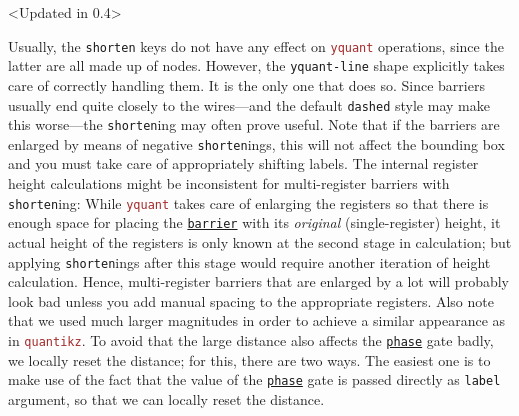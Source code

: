 \documentclass{scrartcl}
\makeatletter
\newenvironment{codeexample*}{%
   \VerbatimEnvironment%
   \let\FVB@VerbatimOut\minted@FVB@VerbatimOut
   \let\FVE@VerbatimOut\minted@FVE@VerbatimOut
   \minted@configlang{tex}%
   \minted@fvset
   \begin{VerbatimOut}[codes={\catcode`\^^I=12},firstline,lastline]{\minted@jobname.pyg}%
}{
   \end{VerbatimOut}%
   \minted@langlinenoson%
   \begin{adjustbox}{center}
       \minted@jobname.pyg %
   \end{adjustbox}\nopagebreak
   \expandafter\minted@pygmentize\expandafter{\minted@lang}%
   \minted@langlinenosoff%
   \par%
}
\def\pkg#1{\textcolor{brown}{\texttt{#1}}}
\def\gate#1{\hyperref[gate:#1]{\texttt{#1}}}
\def\Yquant{\pkg{yquant}}
\makeatother
\begin{document}
            \begin{example}<Updated in 0.4>
               \begin{codeexample*}
               \end{codeexample*}
               Usually, the \texttt{shorten} keys do not have any effect on \Yquant{} operations, since the latter are all made up of nodes.
               However, the \texttt{yquant-line} shape explicitly takes care of correctly handling them.
               It is the only one that does so.
               Since barriers usually end quite closely to the wires---and the default \texttt{dashed} style may make this worse---the \texttt{shorten}ing may often prove useful.
               Note that if the barriers are enlarged by means of negative \texttt{shorten}ings, this will not affect the bounding box and you must take care of appropriately shifting labels.
               The internal register height calculations might be inconsistent for multi\hyp register barriers with \texttt{shorten}ing: While \Yquant{} takes care of enlarging the registers so that there is enough space for placing the \gate{barrier} with its \emph{original} (single\hyp register) height, it actual height of the registers is only known at the second stage in calculation; but applying \texttt{shorten}ings after this stage would require another iteration of height calculation.
               Hence, multi\hyp register barriers that are enlarged by a lot will probably look bad unless you add manual spacing to the appropriate registers.
               Also note that we used much larger magnitudes in order to achieve a similar appearance as in \pkg{quantikz}.
               To avoid that the large distance also affects the \gate{phase} gate badly, we locally reset the distance; for this, there are two ways.
               The easiest one is to make use of the fact that the value of the \gate{phase} gate is passed directly as \texttt{label} argument, so that we can locally reset the distance.

\end{example}
\end{document}
